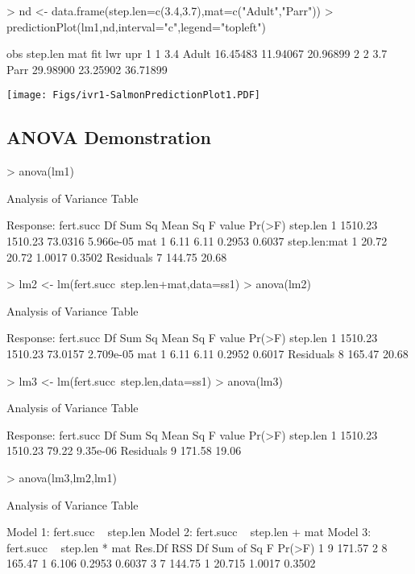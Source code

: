 \documentclass[a4paper]{article}
\begin{document}
\begin{Schunk}
\begin{Sinput}
> nd <- data.frame(step.len=c(3.4,3.7),mat=c("Adult","Parr"))
> predictionPlot(lm1,nd,interval="c",legend="topleft")
\end{Sinput}
\begin{Soutput}
  obs step.len   mat      fit      lwr      upr
1   1      3.4 Adult 16.45483 11.94067 20.96899
2   2      3.7  Parr 29.98900 23.25902 36.71899
\end{Soutput}
\end{Schunk}
\texttt{[image: Figs/ivr1-SalmonPredictionPlot1.PDF]}

\newpage
\subsection{ANOVA Demonstration}
\begin{Schunk}
\begin{Sinput}
> anova(lm1)
\end{Sinput}
\begin{Soutput}
Analysis of Variance Table

Response: fert.succ
             Df  Sum Sq Mean Sq F value    Pr(>F)
step.len      1 1510.23 1510.23 73.0316 5.966e-05
mat           1    6.11    6.11  0.2953    0.6037
step.len:mat  1   20.72   20.72  1.0017    0.3502
Residuals     7  144.75   20.68                  
\end{Soutput}
\begin{Sinput}
> lm2 <- lm(fert.succ~step.len+mat,data=ss1)
> anova(lm2)
\end{Sinput}
\begin{Soutput}
Analysis of Variance Table

Response: fert.succ
          Df  Sum Sq Mean Sq F value    Pr(>F)
step.len   1 1510.23 1510.23 73.0157 2.709e-05
mat        1    6.11    6.11  0.2952    0.6017
Residuals  8  165.47   20.68                  
\end{Soutput}
\begin{Sinput}
> lm3 <- lm(fert.succ~step.len,data=ss1)
> anova(lm3)
\end{Sinput}
\begin{Soutput}
Analysis of Variance Table

Response: fert.succ
          Df  Sum Sq Mean Sq F value   Pr(>F)
step.len   1 1510.23 1510.23   79.22 9.35e-06
Residuals  9  171.58   19.06                 
\end{Soutput}
\begin{Sinput}
> anova(lm3,lm2,lm1)
\end{Sinput}
\begin{Soutput}
Analysis of Variance Table

Model 1: fert.succ ~ step.len
Model 2: fert.succ ~ step.len + mat
Model 3: fert.succ ~ step.len * mat
  Res.Df    RSS Df Sum of Sq      F Pr(>F)
1      9 171.57                           
2      8 165.47  1     6.106 0.2953 0.6037
3      7 144.75  1    20.715 1.0017 0.3502
\end{Soutput}
\end{Schunk}
\end{document}

